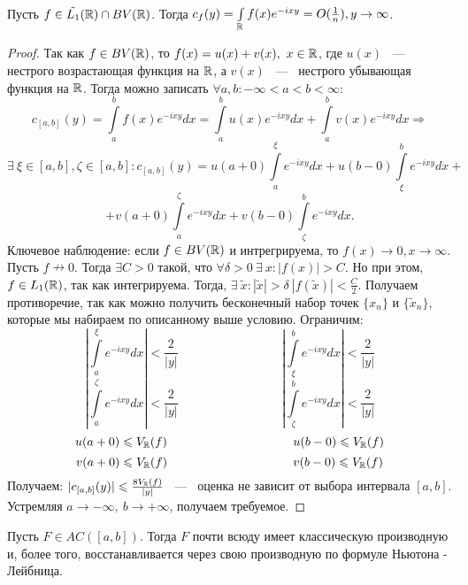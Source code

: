 \begin{lemma}[Основная]
    Пусть $f \in \tilde{L_1}(\mathbb{R}) \cap BV(\mathbb{R})$. Тогда $c_f(y) = \int\limits_{\mathbb{R}}f(x) e^{-ixy} = O(\frac{1}{n}), y \rightarrow \infty$.
\end{lemma}
\begin{proof}
    Так как $f \in BV(\mathbb{R})$, то $f(x) = u(x) + v(x), \ x \in \mathbb{R}$, где $u(x)$ ~---~ нестрого возрастающая функция на $\mathbb{R}$, а $v(x)$ ~---~ нестрого убывающая функция на $\mathbb{R}$. \newline
    Тогда можно записать $\forall a, b : -\infty < a < b < \infty$:
    $$
    c_{[a, b]}(y) = \int\limits_{a}^{b} f(x) e^{-ixy} dx = \int\limits_{a}^{b} u(x) e^{-ixy} dx + \int\limits_{a}^{b} v(x) e^{-ixy} dx \Rightarrow
    $$
    $$
    \exists \ \xi \in [a, b], \zeta \in [a, b] : c_{[a, b]}(y) = u(a + 0) \int\limits_{a}^{\xi} e^{-ixy} dx + u(b - 0)\int\limits_{\xi}^{b} e^{-ixy} dx +
    $$
    $$
     + v(a + 0) \int\limits_{a}^{\zeta} e^{-ixy} dx + v(b - 0) \int\limits_{\zeta}^{b} e^{-ixy} dx.
    $$
    Ключевое наблюдение: если $f \in BV(\mathbb{R})$ и интрегрируема, то $f(x) \rightarrow 0, x \rightarrow \infty$. \newline
    Пусть $f \nrightarrow 0$. Тогда $\exists C > 0$ такой, что $\forall \delta > 0 \ \exists \ x : |f(x)| > C$. Но при этом, $f \in L_1(\mathbb{R})$, так как интегрируема. Тогда, $\exists \ \tilde{x} : |\tilde{x}| > \delta \  |f(\tilde{x})| < \frac{C}{2}$. Получаем противоречие, так как можно получить бесконечный набор точек $\{x_n\}$ и $\{\tilde{x}_n\}$, которые мы набираем по описанному выше условию. \newline
    Ограничим:
    $$
    \left| \int\limits_{a}^{\xi} e^{-ixy} dx \right| < \frac{2}{|y|} \hspace{100pt} \left| \int\limits_{\xi}^{b} e^{-ixy} dx \right| < \frac{2}{|y|}
    $$
    $$
    \left| \int\limits_{a}^{\zeta} e^{-ixy} dx \right| < \frac{2}{|y|} \hspace{100pt} \left| \int\limits_{\zeta}^{b} e^{-ixy} dx \right| < \frac{2}{|y|}
    $$
    $$
    u(a + 0) \le V_{\R}(f) \hspace{102pt} u(b - 0) \le V_{\R}(f)
    $$
    $$
    v(a + 0) \le V_{\R}(f) \hspace{102pt} v(b - 0) \le V_{\R}(f)
    $$
    Получаем: $|c_{[a, b]}(y)| \leqslant \frac{8 V_{\mathbb{R}}(f)}{|y|}$ ~---~ оценка не зависит от выбора интервала $[a, b]$. Устремляя $a \rightarrow -\infty, \ b \rightarrow +\infty$, получаем требуемое.
\end{proof}

\begin{theorem}[б/д]
    Пусть $F \in AC([a, b])$. Тогда $F$ почти всюду имеет классическую производную и, более того, восстанавливается через свою производную по формуле Ньютона - Лейбница.
\end{theorem}

